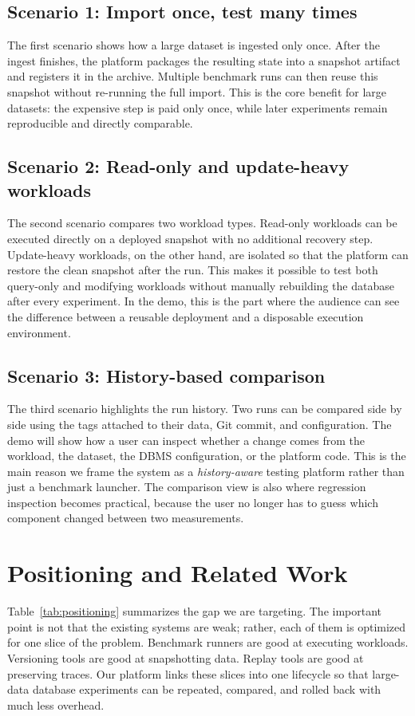 \documentclass[runningheads]{llncs}
\begin{document}
\subsection{Scenario 1: Import once, test many times}
The first scenario shows how a large dataset is ingested only once. After the ingest finishes, the platform packages the resulting state into a snapshot artifact and registers it in the archive. Multiple benchmark runs can then reuse this snapshot without re-running the full import. This is the core benefit for large datasets: the expensive step is paid only once, while later experiments remain reproducible and directly comparable.

\subsection{Scenario 2: Read-only and update-heavy workloads}
The second scenario compares two workload types. Read-only workloads can be executed directly on a deployed snapshot with no additional recovery step. Update-heavy workloads, on the other hand, are isolated so that the platform can restore the clean snapshot after the run. This makes it possible to test both query-only and modifying workloads without manually rebuilding the database after every experiment. In the demo, this is the part where the audience can see the difference between a reusable deployment and a disposable execution environment.

\subsection{Scenario 3: History-based comparison}
The third scenario highlights the run history. Two runs can be compared side by side using the tags attached to their data, Git commit, and configuration. The demo will show how a user can inspect whether a change comes from the workload, the dataset, the DBMS configuration, or the platform code. This is the main reason we frame the system as a \emph{history-aware} testing platform rather than just a benchmark launcher. The comparison view is also where regression inspection becomes practical, because the user no longer has to guess which component changed between two measurements.

\section{Positioning and Related Work}
Table~\ref{tab:positioning} summarizes the gap we are targeting. The important point is not that the existing systems are weak; rather, each of them is optimized for one slice of the problem. Benchmark runners are good at executing workloads. Versioning tools are good at snapshotting data. Replay tools are good at preserving traces. Our platform links these slices into one lifecycle so that large-data database experiments can be repeated, compared, and rolled back with much less overhead.
\end{document}
